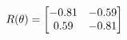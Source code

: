 \documentclass[preview]{standalone}
\begin{document}
\begin{align*}
\special{dvisvgm:raw <g id='unique000'>}R(\theta) = \begin{bmatrix}-0.81 & -0.59\\0.59 & -0.81\end{bmatrix}\special{dvisvgm:raw </g>}
\end{align*}
\end{document}
